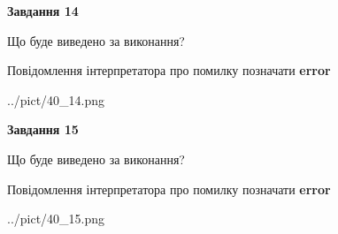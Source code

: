 \documentclass[11pt, ukrainian]{article}
\begin{document}
{\begin {large}
{\begin {center}\textbf{Завдання 14}\end {center}}\par
Що буде виведено за виконання? \par
Повідомлення інтерпретатора про помилку позначати \textbf{error}

\begin{center}
	{../pict/40_14.png}
\end{center}
\newpage

{\begin {center}\textbf{Завдання 15}\end {center}}\par
Що буде виведено за виконання? \par
Повідомлення інтерпретатора про помилку позначати \textbf{error}

\begin{center}
	{../pict/40_15.png}
\end{center}
\newpage

\end {large}}
\end{document}
